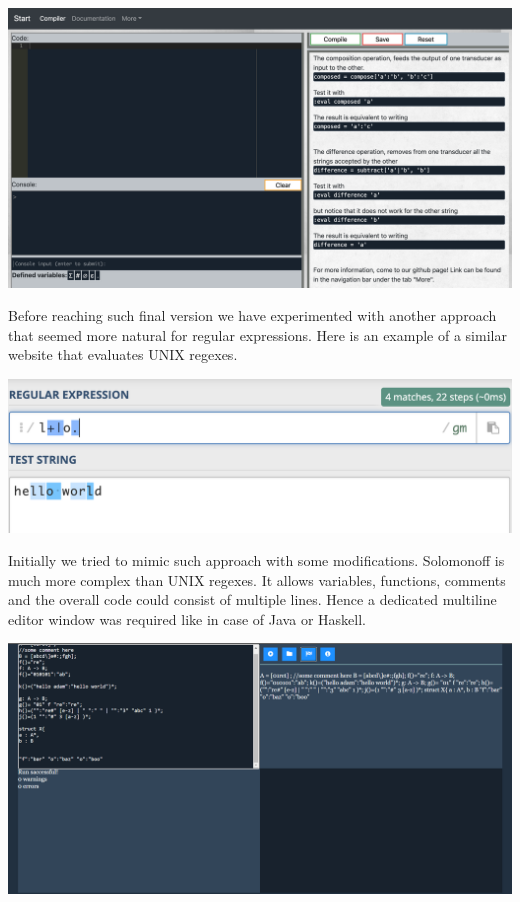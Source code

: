 \begin{center}
     \includegraphics[scale=0.3]{web8.png}
\end{center}
Before reaching such final version we have experimented with another approach that seemed more natural for regular expressions. Here is an example of a similar website that evaluates UNIX regexes.
\begin{center}
     \includegraphics[scale=0.65]{regex.png}
\end{center}
Initially we tried to mimic such approach with some modifications. Solomonoff is much more complex than UNIX regexes. It allows variables, functions, comments and the overall code could consist of multiple lines. Hence a dedicated multiline editor window was required like in case of Java or Haskell.
\begin{center}
     \includegraphics[scale=0.2]{web3.png}
\end{center}
